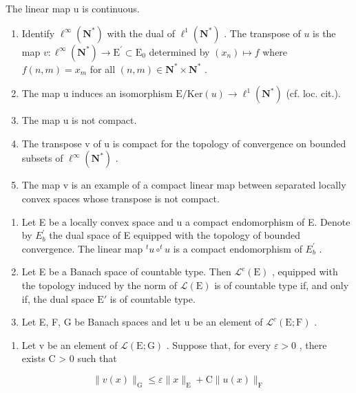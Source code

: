 The linear map u is continuous.

\begin{enumerate}
\def\labelenumi{\alph{enumi})}
\setcounter{enumi}{2}
\item
  Identify \(\ell^{\infty}(\mathbf{N}^{*})\) with the dual of \(\ell^{1}(\mathbf{N}^{*})\) . The transpose of \(u\) is the map \(v\colon \ell^{\infty}(\mathbf{N}^{*})\to \mathrm{E}^{\prime}\subset \mathrm{E}_{0}\) determined by \((x_{n})\mapsto f\) where \(f(n,m) = x_{m}\) for all \((n,m)\in \mathbf{N}^{*}\times \mathbf{N}^{*}\) .
\item
  The map u induces an isomorphism \(\mathrm{E}/\mathrm{Ker}(u)\to\ell^{1}(\mathbf{N}^{*})\) (cf. loc. cit.).
\item
  The map u is not compact.
\item
  The transpose v of u is compact for the topology of convergence on bounded subsets of \(\ell^{\infty}(\mathbf{N}^{*})\) .
\item
  The map v is an example of a compact linear map between separated locally convex spaces whose transpose is not compact.
\end{enumerate}

\begin{enumerate}
\def\labelenumi{\arabic{enumi})}
\setcounter{enumi}{15}
\item
  Let E be a locally convex space and u a compact endomorphism of E. Denote by \(E_{b}^{\prime}\) the dual space of E equipped with the topology of bounded convergence. The linear map \(^{t}u \circ ^{t}u\) is a compact endomorphism of \(E_{b}^{\prime}\) .
\item
  Let E be a Banach space of countable type. Then \(\mathcal{L}^{\mathrm{c}}(\mathrm{E})\) , equipped with the topology induced by the norm of \(\mathcal{L}(\mathrm{E})\) is of countable type if, and only if, the dual space \(\mathrm{E}'\) is of countable type.
\item
  Let E, F, G be Banach spaces and let u be an element of \(\mathcal{L}^{c}(\mathrm{E};\mathrm{F})\) .
\end{enumerate}

\begin{enumerate}
\def\labelenumi{\alph{enumi})}
\tightlist
\item
  Let v be an element of \(\mathcal{L}(\mathrm{E};\mathrm{G})\) . Suppose that, for every \(\varepsilon > 0\) , there exists C \textgreater{} 0 such that
\end{enumerate}

\[
\| v (x) \| _ {\mathrm{G}} \leqslant \varepsilon \| x \| _ {\mathrm{E}} + \mathrm{C} \| u (x) \| _ {\mathrm{F}}
\]

